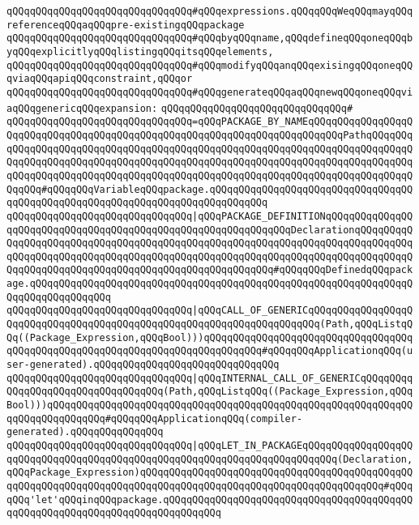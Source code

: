 \verb|qQQqqQQqqQQqqQQqqQQqqQQqqQQqqQQq#qQQqexpressions.qQQqqQQqWeqQQqmayqQQqreferenceqQQqaqQQqpre-existingqQQqpackage|\newline
\verb|qQQqqQQqqQQqqQQqqQQqqQQqqQQqqQQq#qQQqbyqQQqname,qQQqdefineqQQqoneqQQqbyqQQqexplicitlyqQQqlistingqQQqitsqQQqelements,|\newline
\verb|qQQqqQQqqQQqqQQqqQQqqQQqqQQqqQQq#qQQqmodifyqQQqanqQQqexisingqQQqoneqQQqviaqQQqapiqQQqconstraint,qQQqor|\newline
\verb|qQQqqQQqqQQqqQQqqQQqqQQqqQQqqQQq#qQQqgenerateqQQqaqQQqnewqQQqoneqQQqviaqQQqgenericqQQqexpansion:|\newline
\verb|qQQqqQQqqQQqqQQqqQQqqQQqqQQqqQQq#|\newline
\verb|qQQqqQQqqQQqqQQqqQQqqQQqqQQqqQQq=qQQqPACKAGE_BY_NAMEqQQqqQQqqQQqqQQqqQQqqQQqqQQqqQQqqQQqqQQqqQQqqQQqqQQqqQQqqQQqqQQqqQQqqQQqqQQqPathqQQqqQQqqQQqqQQqqQQqqQQqqQQqqQQqqQQqqQQqqQQqqQQqqQQqqQQqqQQqqQQqqQQqqQQqqQQqqQQqqQQqqQQqqQQqqQQqqQQqqQQqqQQqqQQqqQQqqQQqqQQqqQQqqQQqqQQqqQQqqQQqqQQqqQQqqQQqqQQqqQQqqQQqqQQqqQQqqQQqqQQqqQQqqQQqqQQqqQQqqQQqqQQqqQQqqQQqqQQqqQQq#qQQqqQQqVariableqQQqpackage.qQQqqQQqqQQqqQQqqQQqqQQqqQQqqQQqqQQqqQQqqQQqqQQqqQQqqQQqqQQqqQQqqQQqqQQqqQQqqQQq|\newline
\verb|qQQqqQQqqQQqqQQqqQQqqQQqqQQqqQQq|\verb#|qQQqPACKAGE_DEFINITIONqQQqqQQqqQQqqQQqqQQqqQQqqQQqqQQqqQQqqQQqqQQqqQQqqQQqqQQqqQQqqQQqDeclarationqQQqqQQqqQQqqQQqqQQqqQQqqQQqqQQqqQQqqQQqqQQqqQQqqQQqqQQqqQQqqQQqqQQqqQQqqQQqqQQqqQQqqQQqqQQqqQQqqQQqqQQqqQQqqQQqqQQqqQQqqQQqqQQqqQQqqQQqqQQqqQQqqQQqqQQqqQQqqQQqqQQqqQQqqQQqqQQqqQQqqQQqqQQqqQQqqQQq#\verb|#qQQqqQQqDefinedqQQqpackage.qQQqqQQqqQQqqQQqqQQqqQQqqQQqqQQqqQQqqQQqqQQqqQQqqQQqqQQqqQQqqQQqqQQqqQQqqQQqqQQqqQQq|\newline
\verb|qQQqqQQqqQQqqQQqqQQqqQQqqQQqqQQq|\verb#|qQQqCALL_OF_GENERICqQQqqQQqqQQqqQQqqQQqqQQqqQQqqQQqqQQqqQQqqQQqqQQqqQQqqQQqqQQqqQQqqQQqqQQq(Path,qQQqListqQQq((Package_Expression,qQQqBool)))qQQqqQQqqQQqqQQqqQQqqQQqqQQqqQQqqQQqqQQqqQQqqQQqqQQqqQQqqQQqqQQqqQQqqQQqqQQqqQQq#\verb|#qQQqqQQqApplicationqQQq(user-generated).qQQqqQQqqQQqqQQqqQQqqQQqqQQqqQQq|\newline
\verb|qQQqqQQqqQQqqQQqqQQqqQQqqQQqqQQq|\verb#|qQQqINTERNAL_CALL_OF_GENERICqQQqqQQqqQQqqQQqqQQqqQQqqQQqqQQqqQQq(Path,qQQqListqQQq((Package_Expression,qQQqBool)))qQQqqQQqqQQqqQQqqQQqqQQqqQQqqQQqqQQqqQQqqQQqqQQqqQQqqQQqqQQqqQQqqQQqqQQqqQQqqQQq#\verb|#qQQqqQQqApplicationqQQq(compiler-generated).qQQqqQQqqQQqqQQq|\newline
\verb|qQQqqQQqqQQqqQQqqQQqqQQqqQQqqQQq|\verb#|qQQqLET_IN_PACKAGEqQQqqQQqqQQqqQQqqQQqqQQqqQQqqQQqqQQqqQQqqQQqqQQqqQQqqQQqqQQqqQQqqQQqqQQqqQQq(Declaration,qQQqPackage_Expression)qQQqqQQqqQQqqQQqqQQqqQQqqQQqqQQqqQQqqQQqqQQqqQQqqQQqqQQqqQQqqQQqqQQqqQQqqQQqqQQqqQQqqQQqqQQqqQQqqQQqqQQqqQQqqQQq#\verb|#qQQqqQQq'let'qQQqinqQQqpackage.qQQqqQQqqQQqqQQqqQQqqQQqqQQqqQQqqQQqqQQqqQQqqQQqqQQqqQQqqQQqqQQqqQQqqQQqqQQqqQQq|\newline
